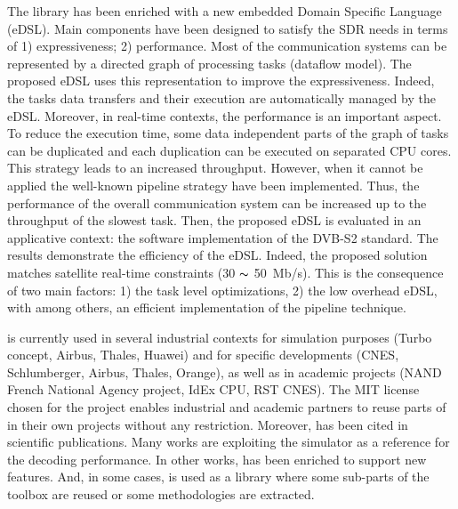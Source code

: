 The \AFFECT library has been enriched with a new embedded Domain Specific
Language (eDSL). Main components have been designed to satisfy the SDR needs in
terms of 1) expressiveness; 2) performance. Most of the communication systems
can be represented by a directed graph of processing tasks (dataflow model). The
proposed eDSL uses this representation to improve the expressiveness. Indeed,
the tasks data transfers and their execution are automatically managed by the
eDSL. Moreover, in real-time contexts, the performance is an important aspect.
To reduce the execution time, some data independent parts of the graph of tasks
can be duplicated and each duplication can be executed on separated CPU cores.
This strategy leads to an increased throughput. However, when it cannot be
applied the well-known pipeline strategy have been implemented. Thus, the
performance of the overall communication system can be increased up to the
throughput of the slowest task. Then, the proposed eDSL is evaluated in an
applicative context: the software implementation of the DVB-S2 standard. The
results demonstrate the efficiency of the \AFFECT eDSL. Indeed, the proposed
solution matches satellite real-time constraints (30 $\thicksim$ 50~Mb/s). This
is the consequence of two main factors: 1) the task level optimizations, 2) the
low overhead eDSL, with among others, an efficient implementation of the
pipeline technique.

\AFFECT is currently used in several industrial contexts for simulation purposes
(Turbo concept, Airbus, Thales, Huawei) and for specific developments (CNES,
Schlumberger, Airbus, Thales, Orange), as well as in academic projects (NAND
French National Agency project, IdEx CPU, RST CNES). The MIT license chosen for
the project enables industrial and academic partners to reuse parts of \AFFECT
in their own projects without any restriction. Moreover, \AFFECT has been cited
in scientific publications. Many works are exploiting the \AFFECT simulator as a
reference for the decoding performance. In other works, \AFFECT has been
enriched to support new features. And, in some cases, \AFFECT is used as a
library where some sub-parts of the toolbox are reused or some methodologies are
extracted.

